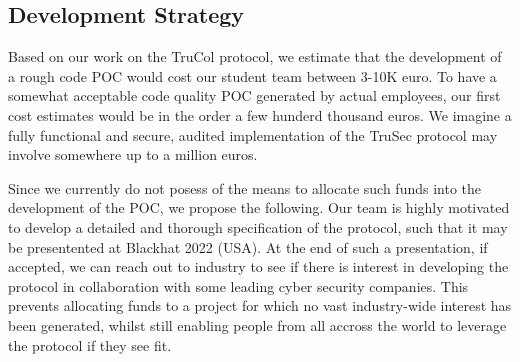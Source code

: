 \subsection{Development Strategy}
Based on our work on the TruCol protocol, we estimate that the development of a rough code POC would cost our student team between 3-10K euro. To have a somewhat acceptable code quality POC generated by actual employees, our first cost estimates would be in the order a few hunderd thousand euros. We imagine a fully functional and secure, audited implementation of the TruSec protocol may involve somewhere up to a million euros. 

Since we currently do not posess of the means to allocate such funds into the development of the POC, we propose the following. Our team is highly motivated to develop a detailed and thorough specification of the protocol, such that it may be presentented at Blackhat 2022 (USA). At the end of such a presentation, if accepted, we can reach out to industry to see if there is interest in developing the protocol in collaboration with some leading cyber security companies. This prevents allocating funds to a project for which no vast industry-wide interest has been generated, whilst still enabling people from all accross the world to leverage the protocol if they see fit.